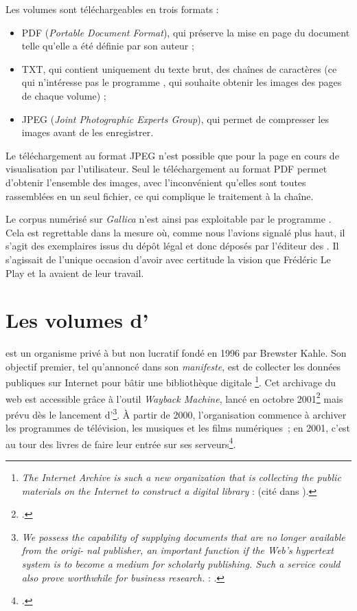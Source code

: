 Les volumes sont téléchargeables en trois formats :

\begin{itemize}
    \item PDF (\textit{Portable Document Format}), qui préserve la mise en page du document telle qu'elle a été définie par son auteur ;
    \item TXT, qui contient uniquement du texte brut, \cad{} des chaînes de caractères (ce qui n'intéresse pas le programme \timeus, qui souhaite obtenir les images des pages de chaque volume) ;
    \item JPEG (\textit{Joint Photographic Experts Group}), qui permet de compresser les images avant de les enregistrer.
\end{itemize}

Le téléchargement au format JPEG n'est possible que pour la page en cours de visualisation par l'utilisateur. Seul le téléchargement au format PDF permet d'obtenir l'ensemble des images, avec l'inconvénient qu'elles sont toutes rassemblées en un seul fichier, ce qui complique le traitement à la chaîne.

Le corpus numérisé sur \textit{Gallica} n'est ainsi pas exploitable par le programme \timeus. Cela est regrettable dans la mesure où, comme nous l'avions signalé plus haut, il s'agit des exemplaires issus du dépôt légal et donc déposés par l'éditeur des \odm. Il s'agissait de l'unique occasion d'avoir avec certitude la vision que Frédéric Le Play et la \sess{} avaient de leur travail.

\section{Les volumes d'\ia}

\ia{} est un organisme privé à but non lucratif fondé en 1996 par Brewster Kahle. Son objectif premier, tel qu'annoncé dans son \textit{manifeste}, est de \og collecter les données publiques sur Internet pour bâtir une bibliothèque digitale \fg{}\footnote{\og \textit{The Internet Archive is such a new organization that is collecting the public materials on the Internet to construct a digital library} \fg{} : \cite{Brewster1} (cité dans \cite{Brewster2}).}. Cet archivage du web est accessible grâce à l'outil \textit{Wayback Machine}, lancé en octobre 2001\footcite[p.344]{panos} mais prévu dès le lancement d'\ia\footnote{\textit{We possess the capability of supplying documents that are no longer available from the origi- nal publisher, an important function if the Web’s hypertext system is to become a medium for scholarly publishing. Such a service could also prove worthwhile for business research.} : \cite[p.83]{iamanifest}.}. À partir de 2000, l'organisation commence à archiver les programmes de télévision, les musiques et les films numériques~; en 2001, c'est au tour des livres de faire leur entrée sur ses serveurs\footcite[p. 3-4]{Brewster2}.

